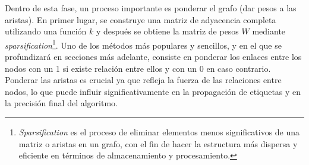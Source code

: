 Dentro de esta fase, un proceso importante es ponderar el grafo (dar pesos a las aristas). En primer lugar, se construye una matriz de adyacencia completa utilizando una función $k$ y después se obtiene la matriz de pesos $W$ mediante \textit{sparsification}\footnote{\textit{Sparsification} es el proceso de eliminar elementos menos significativos de una matriz o aristas en un grafo, con el fin de hacer la estructura más dispersa y eficiente en términos de almacenamiento y procesamiento.}. Uno de los métodos más populares y sencillos, y en el que se profundizará en secciones más adelante, consiste en ponderar los enlaces entre los nodos con un 1 si existe relación entre ellos y con un 0 en caso contrario. Ponderar las aristas es crucial ya que refleja la fuerza de las relaciones entre nodos, lo que puede influir significativamente en la propagación de etiquetas y en la precisión final del algoritmo.


